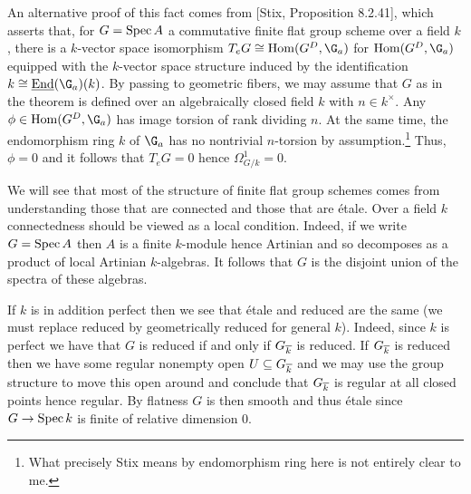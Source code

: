 \documentclass[11pt]{article}
\begin{document}
An alternative proof of this fact comes from [Stix, Proposition 8.2.41], which asserts that, for $G=\operatorname{Spec} A$ a commutative finite flat group scheme over a field $k$, there is a $k$-vector space isomorphism $T_eG\iso\Hom(G^D,\G_a)$ for $\Hom(G^D,\G_a)$ equipped with the $k$-vector space structure induced by the identification $k\iso\un{\End}(\G_a)(k)$. By passing to geometric fibers, we may assume that $G$ as in the theorem is defined over an algebraically closed field $k$ with $n\in k^{\times}$. Any $\phi\in\Hom(G^D,\G_a)$ has image torsion of rank dividing $n$. At the same time, the endomorphism ring $k$ of $\G_a$ has no nontrivial $n$-torsion by assumption.\footnote{What precisely Stix means by endomorphism ring here is not entirely clear to me.} Thus, $\phi=0$ and it follows that $T_eG=0$ hence $\Omega_{G/k}^1=0$.

We will see that most of the structure of finite flat group schemes comes from understanding those that are connected and those that are \'{e}tale. Over a field $k$ connectedness should be viewed as a local condition. Indeed, if we write $G=\operatorname{Spec} A$ then $A$ is a finite $k$-module hence Artinian and so decomposes as a product of local Artinian $k$-algebras. It follows that $G$ is the disjoint union of the spectra of these algebras. 

If $k$ is in addition perfect then we see that \'{e}tale and reduced are the same (we must replace reduced by geometrically reduced for general $k$). Indeed, since $k$ is perfect we have that $G$ is reduced if and only if $G_{\overline{k}}$ is reduced. If $G_{\overline{k}}$ is reduced then we have some regular nonempty open $U\subseteq G_{\overline{k}}$ and we may use the group structure to move this open around and conclude that $G_{\overline{k}}$ is regular at all closed points hence regular. By flatness $G$ is then smooth and thus \'{e}tale since $G\to\operatorname{Spec} k$ is finite of relative dimension $0$. 
\end{document}
